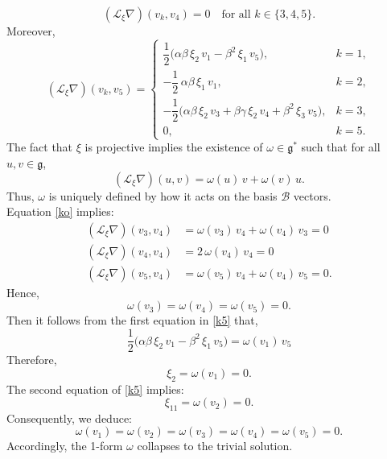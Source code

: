 \documentclass[10pt]{article}
\begin{document}
\begin{equation}\label{ko}
(\mathscr{L}_\xi\nabla)(v_k, v_4) = 0 
\quad\text{for all } k \in \{3,4,5\}.
\end{equation}
Moreover,
\begin{equation}\label{k5}
(\mathscr{L}_\xi\nabla)(v_k, v_5) =
\begin{cases}
\dfrac{1}{2}\bigl(\alpha\beta\,\xi_2\,v_1 - \beta^2\,\xi_1\,v_5\bigr), & k = 1,\\
-\dfrac{1}{2}\,\alpha\beta\,\xi_1\,v_1, & k = 2,\\
-\dfrac{1}{2}\bigl(\alpha\beta\,\xi_2\,v_3 + \beta\gamma\,\xi_2\,v_4 + \beta^2\,\xi_3\,v_5\bigr), & k = 3,\\
0, & k = 5.
\end{cases}
\end{equation}
The fact that $\xi$ is projective implies the existence of $\omega \in \mathfrak{g}^*$ such that for all $u,v\in\mathfrak{g}$,
\[
(\mathscr{L}_\xi\nabla)(u,v)=\omega(u)\,v+\omega(v)\,u.
\]
Thus, $\omega$ is uniquely defined by how it acts on the basis $\mathcal{B}$ vectors.\\
Equation \eqref{ko} implies:
\begin{align*}
(\mathscr{L}_\xi\nabla)(v_3, v_4) &= \omega(v_3)\,v_4 + \omega(v_4)\,v_3 = 0\\
(\mathscr{L}_\xi\nabla)(v_4, v_4) &= 2\,\omega(v_4)\,v_4 = 0\\
(\mathscr{L}_\xi\nabla)(v_5, v_4) &= \omega(v_5)\,v_4 + \omega(v_4)\,v_5 = 0.
\end{align*}
Hence,
\[
\omega(v_3) = \omega(v_4) = \omega(v_5) = 0.
\]
Then it follows from the first equation in \eqref{k5} that, 
\[
\dfrac{1}{2}\bigl(\alpha\beta\,\xi_2\,v_1 - \beta^2\,\xi_1\,v_5\bigr) = \omega(v_1)\,v_5
\]
Therefore, 
$$\xi_2 = \omega(v_1)=0.$$
The second equation of \eqref{k5} implies:
\[
\xi_11 = \omega(v_2)= 0.
\]
Consequently, we deduce:
\[
\omega(v_1) = \omega(v_2) = \omega(v_3) = \omega(v_4) = \omega(v_5) = 0.
\]
Accordingly, the 1-form \(\omega\) collapses to the trivial solution.
\end{document}
